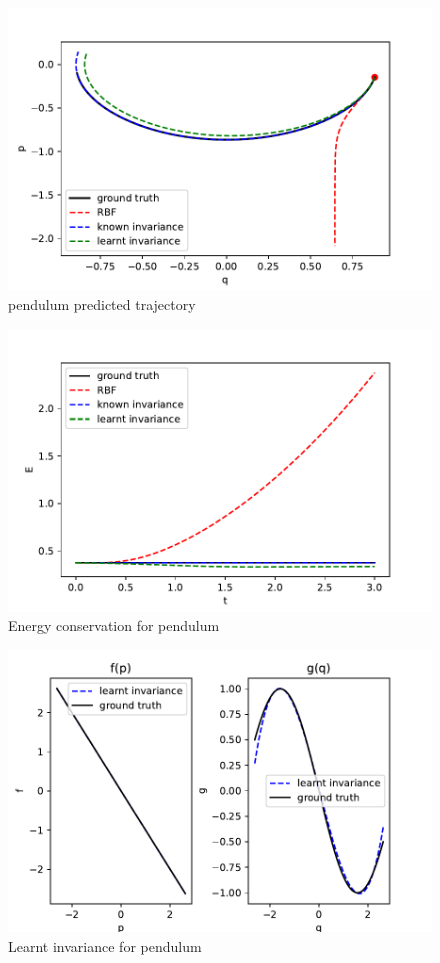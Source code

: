 \documentclass{statsmsc}
\begin{document}
\begin{figure}[H]
        \centering
        \includegraphics[width=0.8\linewidth]{../codes/figures/pendulum_predicted.pdf}
        \caption{pendulum predicted trajectory}
        \label{fig:pendulum_prediction}
\end{figure}

\begin{figure}[H] 
  \includegraphics[width=0.8\linewidth]{../codes/figures/pendulum_energy.pdf}
  \centering
  \caption{Energy conservation for pendulum}
  \label{fig:pendulum_energy}
\end{figure}

\begin{figure}[H] 
  \includegraphics[width=0.8\linewidth]{../codes/figures/pendulum_learnt.pdf}
  \centering
  \caption{Learnt invariance for pendulum}
  \label{fig:pendulum_learnt}
\end{figure}
\end{document}
